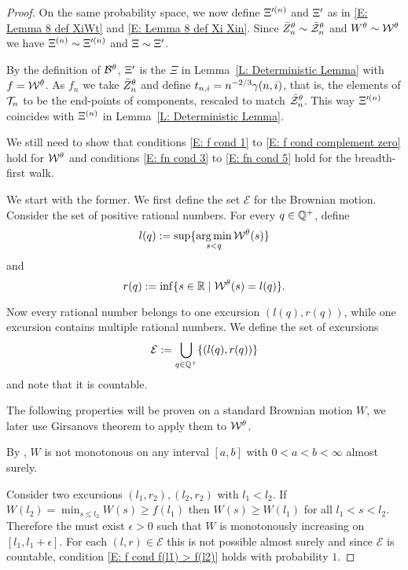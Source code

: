 \begin{proof}
	On the same probability space, we now define $\Xi^{\prime (n)}$ and $\Xi^{\prime}$ as in \eqref{E: Lemma 8 def XiWt} and \eqref{E: Lemma 8 def Xi Xin}.
	Since $\bar{Z}^{\theta}_n \sim \bar{\mathcal{Z}}^{\theta}_n$ and $W^{\theta} \sim \mathcal{W}^{\theta}$ we have $\Xi^{(n)} \sim \Xi^{\prime (n)}$ and $\Xi \sim \Xi^{\prime}$.
	
	By the definition of $\mathcal{B}^{\theta}$, 
	$\Xi^{\prime}$ is the $\Xi$ in Lemma~\ref{L: Deterministic Lemma} with $f = \mathcal{W}^{\theta}$.
	As $f_n$ we take $\bar{Z}^{\theta}_n$ and define $t_{n, i} = n^{-2 / 3} \gamma(n,i)$, that is, 
	the elements of $\mathcal{T}_n$ to be the end-points of components,
	rescaled to match $\bar{\mathcal{Z}}^{\theta}_n$.
	This way $\Xi^{\prime (n)}$ coincides with $\Xi^{(n)}$ in Lemma~\ref{L: Deterministic Lemma}.
	
	We still need to show that conditions \eqref{E: f cond 1} to \eqref{E: f cond complement zero} hold for $\mathcal{W}^{\theta}$
	and conditions \eqref{E: fn cond 3} to \eqref{E: fn cond 5} hold for the breadth-first walk.
	
	We start with the former. 
	We first define the set $\mathcal{E}$ for the Brownian motion.
	Consider the set of positive rational numbers.
	For every $q \in \mathbb{Q}^+$, 
	define 
	\begin{equation}
		l(q) := \sup\{ \operatorname*{arg\,min}_{s < q} \mathcal{W}^{\theta}(s) \}
	\end{equation}
	and
	\begin{equation}
		r(q) := \inf\{ {s \in \mathbb{R} \; | \; \mathcal{W}^{\theta}(s) = l(q)} \}.
	\end{equation}
	
	Now every rational number belongs to one excursion $(l(q), r(q))$,
	while one excursion contains multiple rational numbers.
	We define the set of excursions
	\begin{equation}
	\mathcal{E} := \bigcup_{q \in \mathbb{Q}^+} \{ (l(q), r(q)) \}
	\end{equation}
	and note that it is countable.
	
	The following properties will be proven on a standard Brownian motion $W$,
	we later use Girsanovs theorem to apply them to $\mathcal{W}^{\theta}$.
	
	By \cite[Theorem 1.22, p.18]{Morters.2010},
	$W$ is not monotonous on any interval $[a,b]$ with $0 < a < b < \infty$ almost surely.
	
	Consider two excursions $(l_1, r_2), (l_2, r_2)$ with $l_1 < l_2$.
	If $W(l_2) = \min_{s \leq l_2} W(s) \geq f(l_1)$ then $W(s) \geq W(l_1)$ for all $l_1 < s < l_2$.
	Therefore the must exist $\epsilon>0$ such that $W$ is monotonously increasing on $[l_1, l_1 + \epsilon]$.
	For each $(l,r) \in \mathcal{E}$ this is not possible almost surely
	and since $\mathcal{E}$ is countable,
	condition \eqref{E: f cond f(l1) > f(l2)} holds with probability $1$.
	

\end{proof}
